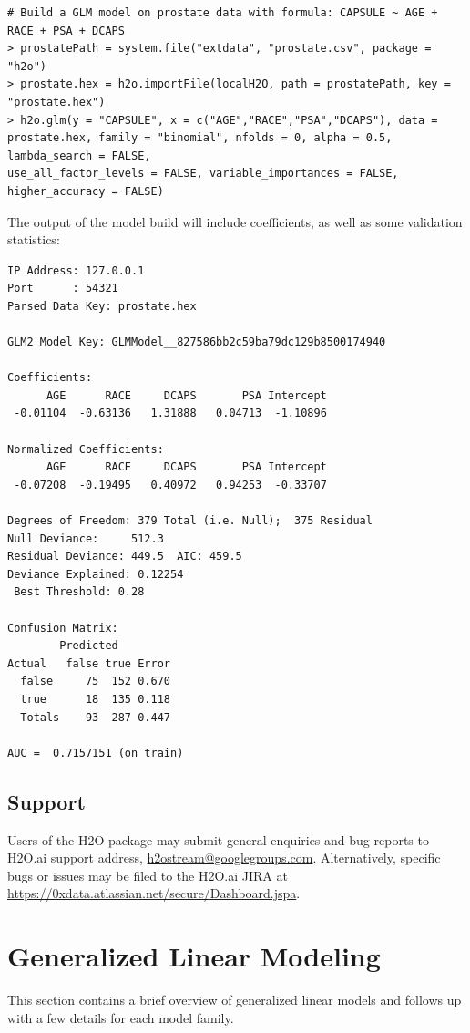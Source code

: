 \documentclass{article}[11pt]
\begin{document}
\begin{lstlisting}[breaklines,basicstyle=\ttfamily]
# Build a GLM model on prostate data with formula: CAPSULE ~ AGE + RACE + PSA + DCAPS
> prostatePath = system.file("extdata", "prostate.csv", package = "h2o")
> prostate.hex = h2o.importFile(localH2O, path = prostatePath, key = "prostate.hex")
> h2o.glm(y = "CAPSULE", x = c("AGE","RACE","PSA","DCAPS"), data = prostate.hex, family = "binomial", nfolds = 0, alpha = 0.5, lambda_search = FALSE,  
use_all_factor_levels = FALSE, variable_importances = FALSE, higher_accuracy = FALSE)
\end{lstlisting}

\vspace{10 mm}
\noindent
The output of the model build will include coefficients, as well as some validation statistics:

\begin{lstlisting}[breaklines,basicstyle=\ttfamily]
IP Address: 127.0.0.1 
Port      : 54321 
Parsed Data Key: prostate.hex 

GLM2 Model Key: GLMModel__827586bb2c59ba79dc129b8500174940

Coefficients:
      AGE      RACE     DCAPS       PSA Intercept 
 -0.01104  -0.63136   1.31888   0.04713  -1.10896 

Normalized Coefficients:
      AGE      RACE     DCAPS       PSA Intercept 
 -0.07208  -0.19495   0.40972   0.94253  -0.33707 

Degrees of Freedom: 379 Total (i.e. Null);  375 Residual
Null Deviance:     512.3
Residual Deviance: 449.5  AIC: 459.5
Deviance Explained: 0.12254 
 Best Threshold: 0.28

Confusion Matrix:
        Predicted
Actual   false true Error
  false     75  152 0.670
  true      18  135 0.118
  Totals    93  287 0.447

AUC =  0.7157151 (on train)
\end{lstlisting}

\subsection{Support} 

Users of the H2O package may submit general enquiries and bug reports to H2O.ai support address, {\url{h2ostream@googlegroups.com}}. 
Alternatively, specific bugs or issues may be filed to the H2O.ai JIRA at {\url{https://0xdata.atlassian.net/secure/Dashboard.jspa}}.


\section{Generalized Linear Modeling} 
This section contains a brief overview of generalized linear models and follows up with a few details for each model family.
\end{document}
